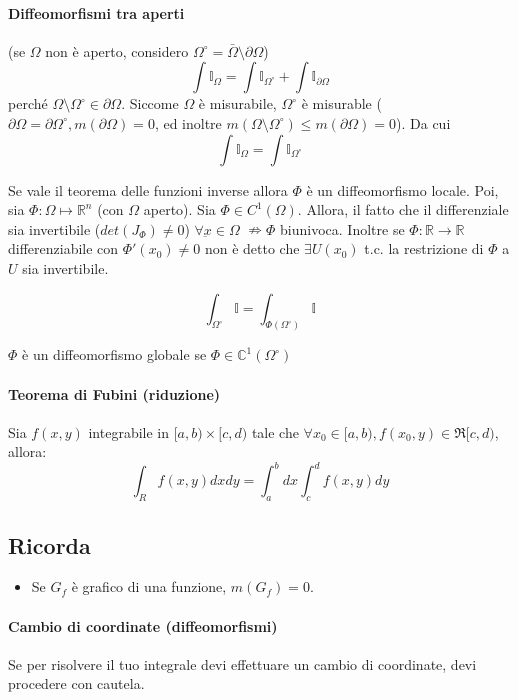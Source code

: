 \documentclass[a4paper,12pt]{book}
\begin{document}
\paragraph{Diffeomorfismi tra aperti}
(se $\Omega$ non è aperto, considero $\Omega^\circ = \bar{\Omega}\setminus\partial\Omega$)\\
$$\int \mathbb{I}_\Omega = \int \mathbb{I}_{\Omega^\circ} + \int \mathbb{I}_{\partial\Omega}$$
perché $\Omega\setminus\Omega^\circ \in \partial\Omega$. Siccome $\Omega$ è misurabile, $\Omega^\circ$ è misurable ($\partial\Omega = \partial\Omega^\circ, m(\partial\Omega) = 0$, ed inoltre $m(\Omega\setminus\Omega^\circ) \leq m(\partial\Omega) = 0$).
Da cui
$$\int \mathbb{I}_\Omega = \int \mathbb{I}_{\Omega^\circ} $$

Se vale il teorema delle funzioni inverse allora $\Phi$ è un diffeomorfismo locale.
Poi, sia $\Phi: \Omega \mapsto \mathbb{R}^n$ (con $\Omega$ aperto). Sia $\Phi \in C^1(\Omega)$. Allora, il fatto che il differenziale sia invertibile ($det(J_\Phi) \neq 0$) $\forall \underbar{x} \in \Omega$ $\nRightarrow \Phi$ biunivoca. Inoltre se $\Phi: \mathbb{R}\rightarrow \mathbb{R}$ differenziabile con $\Phi '(x_0) \neq 0$ non è detto che $\exists U(x_0)$ t.c. la restrizione di $\Phi$ a $U$ sia invertibile.

$$\int_{\Omega^\circ} \mathbb{I} = \int_{\Phi(\Omega^\circ)} \mathbb{I} $$

$\Phi$ è un diffeomorfismo globale se $\Phi \in \mathbb{C}^1(\Omega^\circ)$

\paragraph{Teorema di Fubini (riduzione)}
Sia $f(x, y)$ integrabile in $[a, b)\times[c,d)$ tale che $\forall x_0 \in [a,b), f(x_0, y) \in \Re[c,d)$, allora:
$$\int_R f(x, y)dxdy = \int^b_a dx\int^d_c f(x, y) dy$$

\subsection{Ricorda}
\begin{itemize}
 \item Se $G_f$ è grafico di una funzione, $m(G_f) = 0$.
\end{itemize}
\paragraph{Cambio di coordinate (diffeomorfismi)}
Se per risolvere il tuo integrale devi effettuare un cambio di coordinate, devi procedere con cautela.
\end{document}
